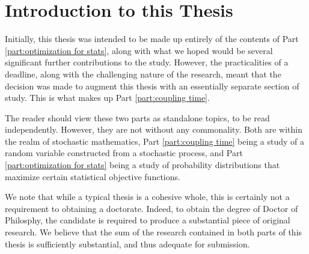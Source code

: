 \chapter{Introduction to this Thesis}
\label{Ch:ThesisIntro}


Initially, this thesis was intended to be made up entirely of the contents of Part \ref{part:optimization for stats}, along with what we hoped would be several significant further contributions to the study. However, the practicalities of a deadline, along with the challenging nature of the research, meant that the decision was made to augment this thesis with an essentially separate section of study. This is what makes up Part \ref{part:coupling time}.

The reader should view these two parts as standalone topics, to be read independently. However, they are not without any commonality. Both are within the realm of stochastic mathematics, Part \ref{part:coupling time} being a study of a random variable constructed from a stochastic process, and Part \ref{part:optimization for stats} being a study of probability distributions that maximize certain statistical objective functions. 

We note that while a typical thesis is a cohesive whole, this is certainly not a requirement to obtaining a doctorate. Indeed, to obtain the degree of Doctor of Philosphy, the candidate is required to produce a substantial piece of original research. We believe that the sum of the research contained in both parts of this thesis is sufficiently substantial, and thus adequate for submission.


